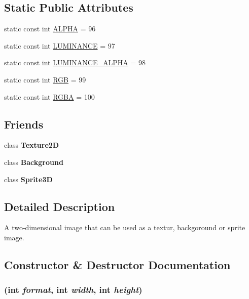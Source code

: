 \subsection*{Static Public Attributes}
\begin{CompactItemize}
\item 
static const int \hyperlink{classm3g_1_1Image2D_417581fcde4067111f47320edb2aa378}{ALPHA} = 96
\item 
static const int \hyperlink{classm3g_1_1Image2D_3cf02f5117269e8ff112cbf5ecb790cd}{LUMINANCE} = 97
\item 
static const int \hyperlink{classm3g_1_1Image2D_1a74b878039f244c27120cacb4eb6a3e}{LUMINANCE\_\-ALPHA} = 98
\item 
static const int \hyperlink{classm3g_1_1Image2D_5f237f1b0f2ce6351e9e4a494b8dc759}{RGB} = 99
\item 
static const int \hyperlink{classm3g_1_1Image2D_0aaf9f2f4c064633c6d2888ec2c39e92}{RGBA} = 100
\end{CompactItemize}
\subsection*{Friends}
\begin{CompactItemize}
\item 
\hypertarget{classm3g_1_1Image2D_a70951a0328ba29f64176f16b3ea47d8}{
class \textbf{Texture2D}}
\label{classm3g_1_1Image2D_a70951a0328ba29f64176f16b3ea47d8}

\item 
\hypertarget{classm3g_1_1Image2D_d70dac188b152e81b4323bb274bee959}{
class \textbf{Background}}
\label{classm3g_1_1Image2D_d70dac188b152e81b4323bb274bee959}

\item 
\hypertarget{classm3g_1_1Image2D_639cf38c41878a4f0fc8d24c010c96de}{
class \textbf{Sprite3D}}
\label{classm3g_1_1Image2D_639cf38c41878a4f0fc8d24c010c96de}

\end{CompactItemize}


\subsection{Detailed Description}
A two-dimensional image that can be used as a textur, backgoround or sprite image. 

\subsection{Constructor \& Destructor Documentation}
\hypertarget{classm3g_1_1Image2D_cea21be298c6584490d2b714c4b29d6b}{
\subsubsection[{Image2D}]{ (int {\em format}, \/  int {\em width}, \/  int {\em height})}}
\label{classm3g_1_1Image2D_cea21be298c6584490d2b714c4b29d6b}


